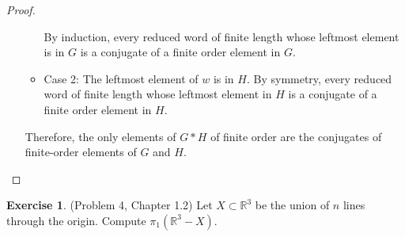 \documentclass[12pt, psamsfonts]{amsart}
\theoremstyle{definition}
\newtheorem*{exer}{Exercise}
\theoremstyle{remark}
\numberwithin{equation}{section}
\begin{document}
\begin{proof}
\begin{itemize}
\begin{itemize}
          By induction, every reduced word of finite length whose leftmost element is in $G$ is a conjugate of a finite order element in $G$.
        \item
          Case 2: The leftmost element of $w$ is in $H$.
          By symmetry, every reduced word of finite length whose leftmost element in $H$ is a conjugate of a finite order element in $H$.
      \end{itemize}

      Therefore, the only elements of $G * H$ of finite order are the conjugates of finite-order elements of $G$ and $H$.
  \end{itemize}
\end{proof}

\begin{exer}{(Problem 4, Chapter 1.2)}
  Let $X \subset \mathbb{R}^3$ be the union of $n$ lines through the origin.
  Compute $\pi_1(\mathbb{R}^3 - X)$.
\end{exer}
\end{document}
